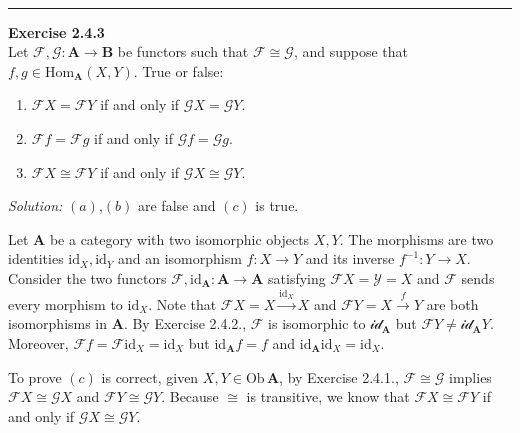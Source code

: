 \documentclass[a4paper, 12pt]{article}
\newenvironment{problem}[2][Exercise]
    { \begin{mdframed}[backgroundcolor=gray!20] \textbf{#1 #2} \\}
    {  \end{mdframed}}
\newenvironment{solution}
    {\textit{Solution:}}
    {}
\begin{document}
\\ 
\noindent\rule{7in}{2.8pt}
\begin{problem}{2.4.3}
Let \(\mathcal{F},\mathcal{G}:\mathbf{A}\rightarrow \mathbf{B}\) be functors such that \(\mathcal{F}\cong \mathcal{G}\), and suppose that 
\(f,g\in \text{Hom}_{\mathbf{A}}(X,Y)\). True or false:
\begin{enumerate}[label=(\emph{\alph*})]
    \item \(\mathcal{F}X=\mathcal{F}Y\) if and only if \(\mathcal{G}X=\mathcal{G}Y\).
    \item \(\mathcal{F}f=\mathcal{F}g\) if and only if \(\mathcal{G}f=\mathcal{G}g\).
    \item \(\mathcal{F}X\cong \mathcal{F}Y\) if and only if \(\mathcal{G}X\cong \mathcal{G}Y\).
\end{enumerate}
\end{problem}
\begin{solution}
\((a)\),\((b)\) are false and \((c)\) is true. 
\par  
Let \(\mathbf{A}\) be a category with two isomorphic objects \(X,Y\). The morphisms are two identities \(\text{id}_X,\text{id}_Y\) and an isomorphism 
\(f:X\rightarrow Y\) and its inverse \(f^{-1}:Y\rightarrow X\). Consider the two functors \(\mathcal{F},\text{id}_{\mathbf{A}}:\mathbf{A}\rightarrow \mathbf{A}\) satisfying 
\(\mathcal{F}X=\mathcal{Y}=X\) and \(\mathcal{F}\) sends every morphism to \(\text{id}_X\). Note that \(\mathcal{F}X=X\xrightarrow{\text{id}_X} X\) and \(\mathcal{F}Y=X\xrightarrow{f} Y\) are both 
isomorphisms in \(\mathbf{A}\). By Exercise 2.4.2., \(\mathcal{F}\) is isomorphic to \(\mathcal{\text{id}_{\mathbf{A}}}\) but \(\mathcal{F}Y\neq \mathcal{\text{id}_{\mathbf{A}}}Y\). Moreover, 
\(\mathcal{F}f=\mathcal{F}\text{id}_X=\text{id}_X\) but \(\text{id}_{\mathbf{A}}f=f\) and \(\text{id}_{\mathbf{A}}\text{id}_X=\text{id}_X\).
\par 
To prove \((c)\) is correct, given \(X,Y\in \text{Ob}\, \mathbf{A}\), by Exercise 2.4.1., \(\mathcal{F}\cong \mathcal{G}\) implies \(\mathcal{F}X\cong \mathcal{G}X\) and \(\mathcal{F}Y\cong \mathcal{G}Y\). Because 
\(\cong\) is transitive, we know that \(\mathcal{F}X\cong \mathcal{F}Y\) if and only if \(\mathcal{G}X\cong \mathcal{G}Y\). 
\end{solution}
\end{document}
